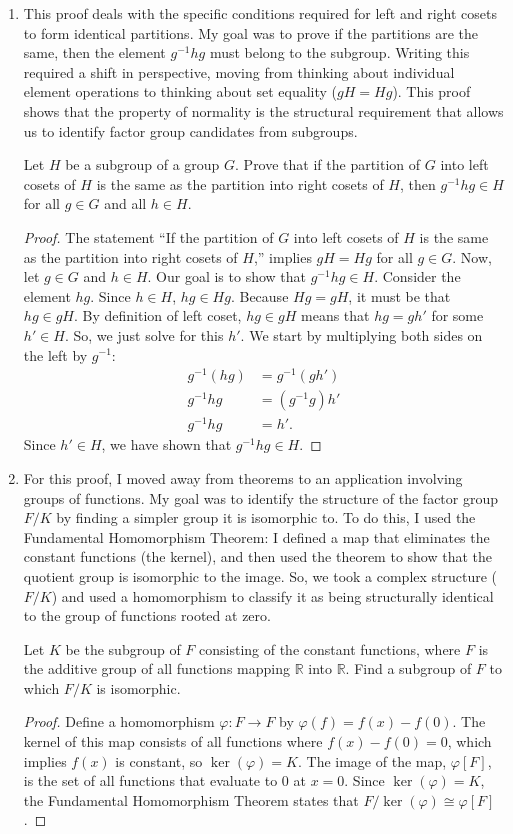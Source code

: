 \documentclass[12pt, oneside]{book}
\newcommand{\pf}[1]{
    \begin{customframedproof}[linecolor=horange!75]
        \begin{proof}
        #1
        \end{proof}
    \end{customframedproof}
}
\newcommand{\R}{\mathbb{R}}
\begin{document}
\begin{enumerate}[label=\textbf{\arabic*.}]
    \item This proof deals with the specific conditions required for left and right cosets to form identical partitions. My goal was to prove if the partitions are the same, then the element \(g^{-1}hg\) must belong to the subgroup. Writing this required a shift in perspective, moving from thinking about individual element operations to thinking about set equality (\(gH=Hg\)). This proof shows that the property of normality is the structural requirement that allows us to identify factor group candidates from subgroups.

    Let \(H\) be a subgroup of a group \(G\). Prove that if the partition of \(G\) into left cosets of \(H\) is the same as the partition into right cosets of \(H\), then \(g^{-1}hg \in H\) for all \(g \in G\) and all \(h \in H\).
    \pf{
        The statement ``If the partition of \(G\) into left cosets of \(H\) is the same as the partition into right cosets of \(H\),'' implies \(gH = Hg\) for all \(g \in G\). Now, let \(g \in G\) and \(h \in H\). Our goal is to show that \(g^{-1}hg \in H\). Consider the element \(hg\). Since \(h \in H\), \(hg \in Hg\). Because \(Hg = gH\), it must be that \(hg \in gH\). By definition of left coset, \(hg \in gH\) means that \(hg = gh'\) for some \(h' \in H\). So, we just solve for this \(h'\). We start by multiplying both sides on the left by \(g^{-1}\):
        \begin{align*}
        g^{-1}(hg) &= g^{-1}(gh') \\
        g^{-1}hg &= (g^{-1}g)h' \\
        g^{-1}hg &= h'.
        \end{align*}
        Since \(h' \in H\), we have shown that \(g^{-1}hg \in H\).
    }

      
    \item For this proof, I moved away from theorems to an application involving groups of functions. My goal was to identify the structure of the factor group \(F/K\) by finding a simpler group it is isomorphic to. To do this, I used the Fundamental Homomorphism Theorem: I defined a map that eliminates the constant functions (the kernel), and then used the theorem to show that the quotient group is isomorphic to the image. So, we took a complex structure (\(F/K\)) and used a homomorphism to classify it as being structurally identical to the group of functions rooted at zero.

    Let \(K\) be the subgroup of \(F\) consisting of the constant functions, where \(F\) is the additive group of all functions mapping \(\R\) into \(\R\). Find a subgroup of \(F\) to which \(F / K\) is isomorphic.
    \pf{
        Define a homomorphism \(\varphi : F \to F\) by \(\varphi(f) = f(x) - f(0)\). The kernel of this map consists of all functions where \(f(x) - f(0) = 0\), which implies \(f(x)\) is constant, so \(\ker(\varphi) = K\). The image of the map, \(\varphi[F]\), is the set of all functions that evaluate to 0 at \(x = 0\). Since \(\ker(\varphi) = K\), the Fundamental Homomorphism Theorem states that \(F/\ker(\varphi) \cong \varphi[F]\). 
    }
\end{enumerate}
\end{document}
